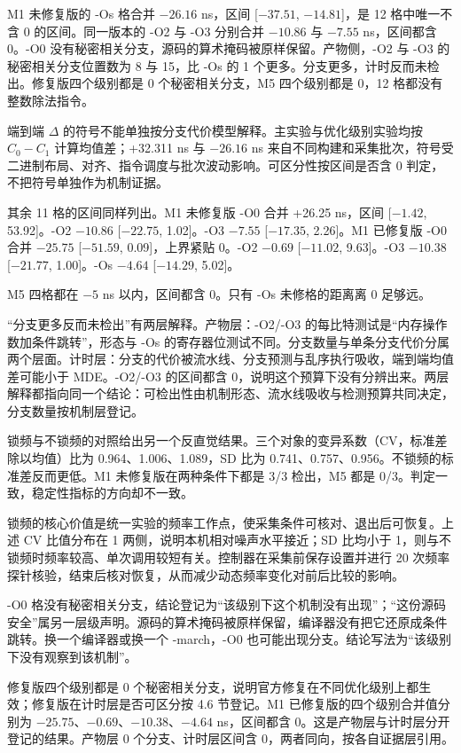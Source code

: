 M1 未修复版的 -Os 格合并 $-26.16$ ns，区间 [$-37.51$, $-14.81$]，是 12 格中唯一不含 0 的区间。同一版本的 -O2 与 -O3 分别合并 $-10.86$ 与 $-7.55$ ns，区间都含 0。-O0 没有秘密相关分支，源码的算术掩码被原样保留。产物侧，-O2 与 -O3 的秘密相关分支位置数为 8 与 15，比 -Os 的 1 个更多。分支更多，计时反而未检出。修复版四个级别都是 0 个秘密相关分支，M5 四个级别都是 0，12 格都没有整数除法指令。%

端到端 $\Delta$ 的符号不能单独按分支代价模型解释。主实验与优化级别实验均按 $C_0-C_1$ 计算均值差；+32.311 ns 与 $-26.16$ ns 来自不同构建和采集批次，符号受二进制布局、对齐、指令调度与批次波动影响。可区分性按区间是否含 0 判定，不把符号单独作为机制证据。%

其余 11 格的区间同样列出。M1 未修复版 -O0 合并 +26.25 ns，区间 [$-1.42$, 53.92]。-O2 $-10.86$ [$-22.75$, 1.02]。-O3 $-7.55$ [$-17.35$, 2.26]。M1 已修复版 -O0 合并 $-25.75$ [$-51.59$, 0.09]，上界紧贴 0。-O2 $-0.69$ [$-11.02$, 9.63]。-O3 $-10.38$ [$-21.77$, 1.00]。-Os $-4.64$ [$-14.29$, 5.02]。

M5 四格都在 $-5$ ns 以内，区间都含 0。只有 -Os 未修格的距离离 0 足够远。

“分支更多反而未检出”有两层解释。产物层：-O2/-O3 的每比特测试是“内存操作数加条件跳转”，形态与 -Os 的寄存器位测试不同。分支数量与单条分支代价分属两个层面。计时层：分支的代价被流水线、分支预测与乱序执行吸收，端到端均值差可能小于 MDE。-O2/-O3 的区间都含 0，说明这个预算下没有分辨出来。两层解释都指向同一个结论：可检出性由机制形态、流水线吸收与检测预算共同决定，分支数量按机制层登记。

锁频与不锁频的对照给出另一个反直觉结果。三个对象的变异系数（CV，标准差除以均值）比为 0.964、1.006、1.089，SD 比为 0.741、0.757、0.956。不锁频的标准差反而更低。M1 未修复版在两种条件下都是 3/3 检出，M5 都是 0/3。判定一致，稳定性指标的方向却不一致。%

锁频的核心价值是统一实验的频率工作点，使采集条件可核对、退出后可恢复。上述 CV 比值分布在 1 两侧，说明本机相对噪声水平接近；SD 比均小于 1，则与不锁频时频率较高、单次调用较短有关。控制器在采集前保存设置并进行 20 次频率探针核验，结束后核对恢复，从而减少动态频率变化对前后比较的影响。


-O0 格没有秘密相关分支，结论登记为“该级别下这个机制没有出现”；“这份源码安全”属另一层级声明。源码的算术掩码被原样保留，编译器没有把它还原成条件跳转。换一个编译器或换一个 -march，-O0 也可能出现分支。结论写法为“该级别下没有观察到该机制”。

修复版四个级别都是 0 个秘密相关分支，说明官方修复在不同优化级别上都生效；修复版在计时层是否可区分按 4.6 节登记。M1 已修复版的四个级别合并值分别为 $-25.75$、$-0.69$、$-10.38$、$-4.64$ ns，区间都含 0。这是产物层与计时层分开登记的结果。产物层 0 个分支、计时层区间含 0，两者同向，按各自证据层引用。

